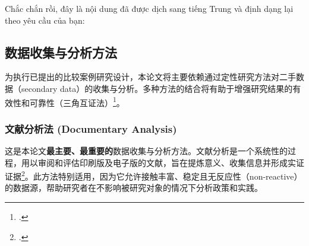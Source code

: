 
Chắc chắn rồi, đây là nội dung đã được dịch sang tiếng Trung và định dạng lại theo yêu cầu của bạn:

\subsection{数据收集与分析方法}
\label{subsec:phuong_phap_cu_the}

为执行已提出的比较案例研究设计，本论文将主要依赖通过定性研究方法对二手数据（secondary data）的收集与分析。多种方法的结合将有助于增强研究结果的有效性和可靠性（三角互证法）\footcite{DenzinLincoln2011}。

\subsubsection{文献分析法 (Documentary Analysis)}
\label{subsubsec:phan_tich_tai_lieu}

这是本论文\textbf{最主要、最重要的}数据收集与分析方法。文献分析是一个系统性的过程，用以审阅和评估印刷版及电子版的文献，旨在提炼意义、收集信息并形成实证证据\footcite{Bowen2009}。此方法特别适用，因为它允许接触丰富、稳定且无反应性（non-reactive）的数据源，帮助研究者在不影响被研究对象的情况下分析政策和实践。

